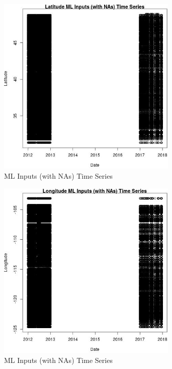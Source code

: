 \begin{figure} 
\centering  
\includegraphics[width=0.77\textwidth]{Code_Outputs/Report_ML_input_PM25_Step4_part_e_de_duplicated_aves_compiled_2019-05-14wNAs_LatitudevDate.jpg} 
\caption{\label{fig:Report_ML_input_PM25_Step4_part_e_de_duplicated_aves_compiled_2019-05-14wNAsLatitudevDate}ML Inputs (with NAs) Time Series} 
\end{figure} 
 

\begin{figure} 
\centering  
\includegraphics[width=0.77\textwidth]{Code_Outputs/Report_ML_input_PM25_Step4_part_e_de_duplicated_aves_compiled_2019-05-14wNAs_LongitudevDate.jpg} 
\caption{\label{fig:Report_ML_input_PM25_Step4_part_e_de_duplicated_aves_compiled_2019-05-14wNAsLongitudevDate}ML Inputs (with NAs) Time Series} 
\end{figure} 
 

